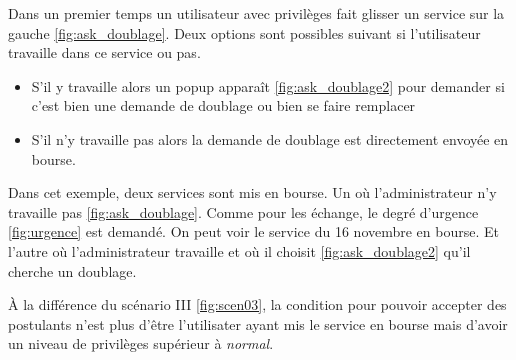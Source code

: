         Dans un premier temps un utilisateur avec privilèges fait glisser un service 
        sur la gauche \ref{fig:ask_doublage}. Deux options sont possibles suivant si l'utilisateur travaille dans ce
        service ou pas.
        \smallskip
        \begin{itemize}
            \item S'il y travaille alors un popup apparaît \ref{fig:ask_doublage2} pour demander si c'est bien une demande de doublage ou bien se faire remplacer
            \item S'il n'y travaille pas alors la demande de doublage est directement envoyée en bourse.
        \end{itemize}
        \medskip
        Dans cet exemple, deux services sont mis en bourse. 
        Un où l'administrateur n'y travaille pas \ref{fig:ask_doublage}. Comme pour les échange, le degré d'urgence \ref{fig:urgence} est demandé. On peut voir le service du 16 novembre en bourse. 
        Et l'autre où l'administrateur travaille et où il choisit \ref{fig:ask_doublage2} qu'il cherche un doublage.

        À la différence du scénario III \ref{fig:scen03}, la condition pour pouvoir
        accepter des postulants n'est plus d'être l'utilisater ayant mis le service en bourse
        mais d'avoir un niveau de privilèges supérieur à \textit{normal}.
        
        



